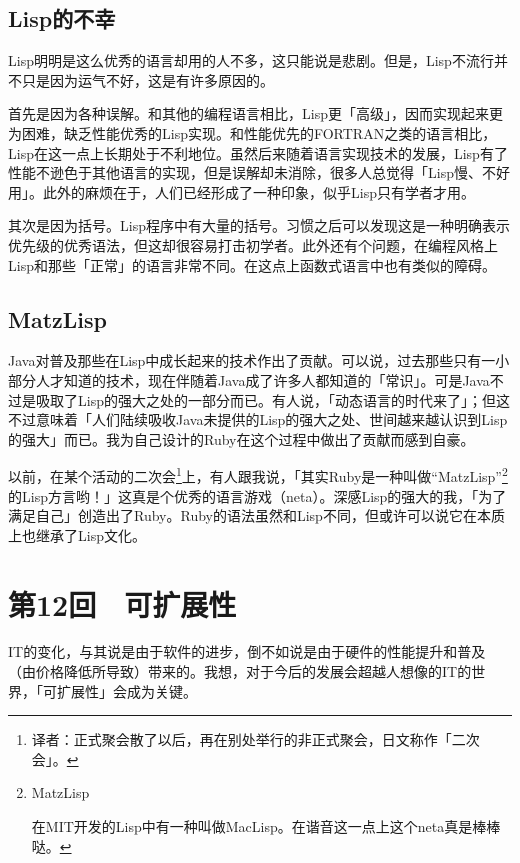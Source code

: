 \documentclass[a4paper,12pt]{article}
\begin{document}
\subsection{Lisp的不幸}

Lisp明明是这么优秀的语言却用的人不多，这只能说是悲剧。但是，Lisp不流行并不只是因为运气不好，这是有许多原因的。

首先是因为各种误解。和其他的编程语言相比，Lisp更「高级」，因而实现起来更为困难，缺乏性能优秀的Lisp实现。和性能优先的FORTRAN之类的语言相比，Lisp在这一点上长期处于不利地位。虽然后来随着语言实现技术的发展，Lisp有了性能不逊色于其他语言的实现，但是误解却未消除，很多人总觉得「Lisp慢、不好用」。此外的麻烦在于，人们已经形成了一种印象，似乎Lisp只有学者才用。

其次是因为括号。Lisp程序中有大量的括号。习惯之后可以发现这是一种明确表示优先级的优秀语法，但这却很容易打击初学者。此外还有个问题，在编程风格上Lisp和那些「正常」的语言非常不同。在这点上函数式语言中也有类似的障碍。

\subsection{MatzLisp}

Java对普及那些在Lisp中成长起来的技术作出了贡献。可以说，过去那些只有一小部分人才知道的技术，现在伴随着Java成了许多人都知道的「常识」。可是Java不过是吸取了Lisp的强大之处的一部分而已。有人说，「动态语言的时代来了」；但这不过意味着「人们陆续吸收Java未提供的Lisp的强大之处、世间越来越认识到Lisp的强大」而已。我为自己设计的Ruby在这个过程中做出了贡献而感到自豪。

以前，在某个活动的二次会\footnote{译者：正式聚会散了以后，再在别处举行的非正式聚会，日文称作「二次会」。}上，有人跟我说，「其实Ruby是一种叫做“MatzLisp”\footnote{MatzLisp

  在MIT开发的Lisp中有一种叫做MacLisp。在谐音这一点上这个neta真是棒棒哒。}的Lisp方言哟！」这真是个优秀的语言游戏（neta）。深感Lisp的强大的我，「为了满足自己」创造出了Ruby。Ruby的语法虽然和Lisp不同，但或许可以说它在本质上也继承了Lisp文化。


\section{第12回　可扩展性}

IT的变化，与其说是由于软件的进步，倒不如说是由于硬件的性能提升和普及（由价格降低所导致）带来的。我想，对于今后的发展会超越人想像的IT的世界，「可扩展性」会成为关键。
\end{document}
